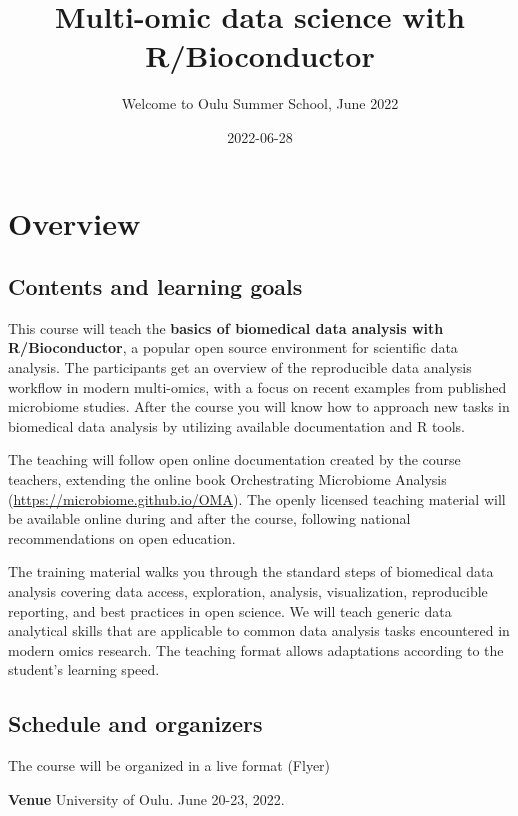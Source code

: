 \documentclass[
  oneside]{book}
\title{Multi-omic data science with R/Bioconductor}
\subtitle{Welcome to Oulu Summer School, June 2022}
\author{}
\date{\vspace{-2.5em}2022-06-28}
\begin{document}
\maketitle

{
\setcounter{tocdepth}{1}
\tableofcontents
}
\hypertarget{overview}{%
\chapter{Overview}\label{overview}}

\hypertarget{contents-and-learning-goals}{%
\section{Contents and learning goals}\label{contents-and-learning-goals}}

This course will teach the \textbf{basics of biomedical data analysis with
R/Bioconductor}, a popular open source environment for scientific
data analysis. The participants get an overview of the reproducible
data analysis workflow in modern multi-omics, with a focus on recent
examples from published microbiome studies. After the course you will
know how to approach new tasks in biomedical data analysis by
utilizing available documentation and R tools.

The teaching will follow open online documentation created by the
course teachers, extending the online book Orchestrating Microbiome
Analysis (\url{https://microbiome.github.io/OMA}). The openly licensed
teaching material will be available online during and after the
course, following national recommendations on open education.

The training material walks you through the standard steps of
biomedical data analysis covering data access, exploration, analysis,
visualization, reproducible reporting, and best practices in open
science. We will teach generic data analytical skills that are
applicable to common data analysis tasks encountered in modern omics
research. The teaching format allows adaptations according to the
student's learning speed.

\hypertarget{schedule-and-organizers}{%
\section{Schedule and organizers}\label{schedule-and-organizers}}

The course will be organized in a live format (Flyer)

\textbf{Venue} University of Oulu. June 20-23, 2022.
\end{document}
